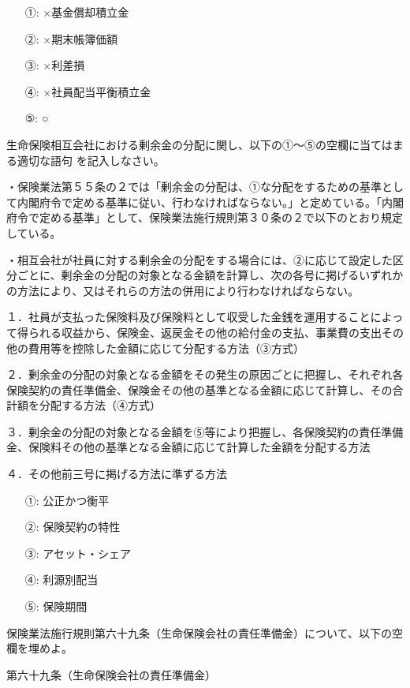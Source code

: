 \documentclass[report,gutter=10mm,fore-edge=10mm,uplatex,dvipdfmx]{jlreq}
\begin{document}
\answer{}
\begin{itemize}
\item[ ①: ] ×基金償却積立金
\item[ ②: ] ×期末帳簿価額
\item[ ③: ] ×利差損
\item[ ④: ] ×社員配当平衡積立金
\item[ ⑤: ] ○
\end{itemize}


生命保険相互会社における剰余金の分配に関し、以下の①～⑤の空欄に当てはまる適切な語句
を記入しなさい。

・保険業法第５５条の２では「剰余金の分配は、①な分配をするための基準として内閣府令で定める基準に従い、行わなければならない。」と定めている。「内閣府令で定める基準」として、保険業法施行規則第３０条の２で以下のとおり規定している。

・相互会社が社員に対する剰余金の分配をする場合には、②に応じて設定した区分ごとに、剰余金の分配の対象となる金額を計算し、次の各号に掲げるいずれかの方法により、又はそれらの方法の併用により行わなければならない。

１．社員が支払った保険料及び保険料として収受した金銭を運用することによって得られる収益から、保険金、返戻金その他の給付金の支払、事業費の支出その他の費用等を控除した金額に応じて分配する方法（③方式）

２．剰余金の分配の対象となる金額をその発生の原因ごとに把握し、それぞれ各保険契約の責任準備金、保険金その他の基準となる金額に応じて計算し、その合計額を分配する方法（④方式）

３．剰余金の分配の対象となる金額を⑤等により把握し、各保険契約の責任準備金、保険料その他の基準となる金額に応じて計算した金額を分配する方法

４．その他前三号に掲げる方法に準ずる方法

\answer{}
\begin{itemize}
\item[ ①: ] 公正かつ衡平
\item[ ②: ] 保険契約の特性
\item[ ③: ] アセット・シェア
\item[ ④: ] 利源別配当
\item[ ⑤: ] 保険期間
\end{itemize}

保険業法施行規則第六十九条（生命保険会社の責任準備金）について、以下の空欄を埋めよ。

第六十九条（生命保険会社の責任準備金）
\end{document}
